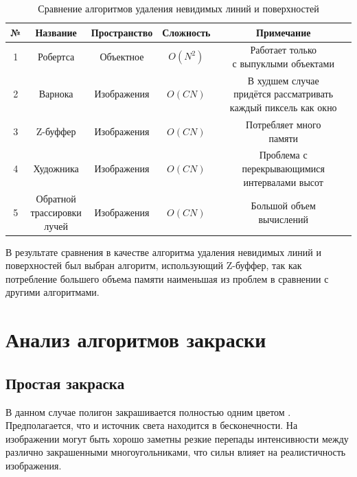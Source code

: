 \begin{table}[h!]
	\small
	\caption{\label{table:draw}Сравнение алгоритмов удаления невидимых линий и поверхностей}
	\begin{center}
		\begin{tabular}{|c|c|c|c|c|}
			\hline
			№ & Название & Пространство & Сложность & Примечание \\
			\hline
			1 & Робертса & Объектное & $O(N^2)$ & \makecell{Работает только\\с выпуклыми объектами} \\
			\hline
			2 & Варнока & Изображения & $O(CN)$ & \makecell{В худшем случае\\придётся рассматривать\\каждый пиксель как окно} \\
			\hline
			3 & Z-буффер & Изображения & $O(CN)$ & \makecell{Потребляет много\\памяти} \\
			\hline
			4 & Художника & Изображения & $O(CN)$ & \makecell{Проблема с перекрывающимися\\интервалами высот} \\
			\hline
			5 & \makecell{Обратной\\трассировки\\лучей} & Изображения & $O(CN)$ & \makecell{Большой объем\\вычислений} \\
			\hline
		\end{tabular}
	\end{center}
\end{table}

В результате сравнения в качестве алгоритма удаления невидимых линий и поверхностей был выбран алгоритм, использующий Z-буффер, так как потребление большего объема памяти наименьшая из проблем в сравнении с другими алгоритмами.

\section{Анализ алгоритмов закраски}

\subsection{Простая закраска}

В данном случае полигон закрашивается полностью одним цветом \cite{algorithms}. Предполагается, что и источник света находится в бесконечности. На изображении могут быть хорошо заметны резкие перепады интенсивности между различно закрашенными многоугольниками, что сильн влияет на реалистичность изображения.

